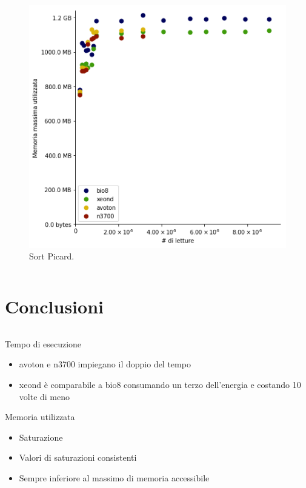 \documentclass{beamer}
\begin{document}
\begin{frame}
\begin{columns}
\begin{column}{0.8\linewidth}	
\begin{figure}[H]
\centering
\includegraphics[scale=0.46]{Max_rss_sort_picard.png}
\caption{Sort Picard.}
\label{fig:RSSind}
\end{figure}
\end{column}
\end{columns}
\end{frame}

\section{Conclusioni}
\begin{frame}
\begin{columns}
\begin{column}{0.8\linewidth}	
\begin{block}{Tempo di esecuzione}
\begin{itemize}
\item avoton e n3700 impiegano il doppio del tempo
\item xeond è comparabile a bio8 consumando un terzo dell'energia e costando 10 volte di meno
\end{itemize}
\end{block}
\begin{block}{Memoria utilizzata}
\begin{itemize}
\item Saturazione
\item Valori di saturazioni consistenti
\item Sempre inferiore al massimo di memoria accessibile
\end{itemize}
\end{block}
\end{column}
\end{columns}
\end{frame}
\end{document}
